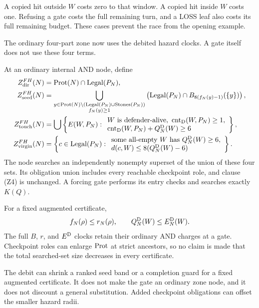 \begin{plainterms}
A copied hit outside $W$ costs zero to that window.  A copied hit inside $W$
costs one.  Refusing a gate costs the full remaining turn, and a LOSS leaf
also costs its full remaining budget.  These cases prevent the race from the
opening example.
\end{plainterms}

The ordinary four-part zone now uses the debited hazard clocks.  A gate itself
does not use these four terms.

\begin{definition}
\label{def:D21}
At an ordinary internal AND node, define
\[
\begin{aligned}
Z_{\mathrm{dir}}^{FH}(N)&=\operatorname{Prot}(N)\cap\operatorname{Legal}(P_N),\\
Z_{\mathrm{seed}}^{FH}(N)&=
 \bigcup_{\substack{y\in\operatorname{Prot}(N)\setminus
 (\operatorname{Legal}(P_N)\cup\operatorname{Stones}(P_N))\\ f_N(y)\ge1}}
 \left(\operatorname{Legal}(P_N)\cap B_{8(f_N(y)-1)}(\{y\})\right),\\
Z_{\mathrm{touch}}^{FH}(N)&=\bigcup\left\{E(W,P_N):
 \begin{array}{l}W\text{ is defender-alive},\ \operatorname{cnt}_{\mathrm{D}}(W,P_N)\ge1,\\
 \operatorname{cnt}_{\mathrm{D}}(W,P_N)+Q_N^{\mathrm{D}}(W)\ge6
 \end{array}\right\},\\
Z_{\mathrm{virgin}}^{FH}(N)&=\left\{c\in\operatorname{Legal}(P_N):
 \begin{array}{l}\text{some all-empty }W\text{ has }Q_N^{\mathrm{D}}(W)\ge6,\\
 d(c,W)\le8(Q_N^{\mathrm{D}}(W)-6)
 \end{array}\right\}.
\end{aligned}
\]
The node searches an independently nonempty superset of the union of these
four sets.  Its obligation union includes every reachable checkpoint role,
and clause \textup{(Z4)} is unchanged.  A forcing gate performs its entry
checks and searches exactly $K(Q)$.

For a fixed augmented certificate,
\[
f_N(\rho)\le r_N(\rho),
\qquad Q_N^{\mathrm{D}}(W)\le E_N^{\mathrm{D}}(W).
\]
The full $B$, $r$, and $E^{\mathrm{D}}$ clocks retain their ordinary AND charges at a
gate.  Checkpoint roles can enlarge $\operatorname{Prot}$ at strict ancestors, so no claim
is made that the total searched-set size decreases in every certificate.
\end{definition}

\begin{plainterms}
The debit can shrink a ranked seed band or a completion guard for a fixed
augmented certificate.  It does not make the gate an ordinary zone node, and
it does not discount a general substitution.  Added checkpoint obligations
can offset the smaller hazard radii.
\end{plainterms}

